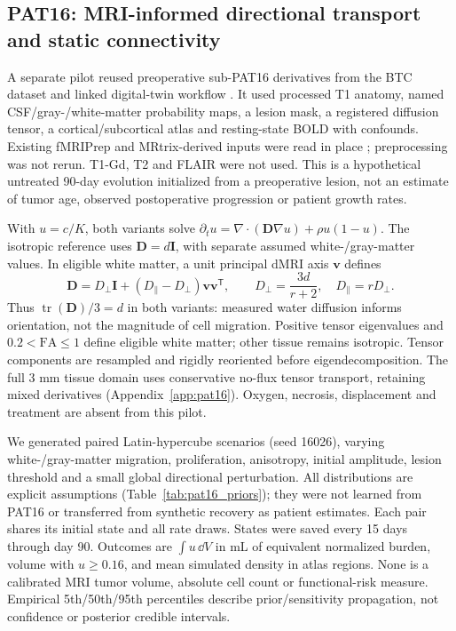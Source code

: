 \subsection{PAT16: MRI-informed directional transport and static connectivity}\label{sec:pat16_methods}
A separate pilot reused preoperative sub-PAT16 derivatives from the BTC dataset and linked digital-twin workflow \citep{aerts2022,lundervold2026twin}. It used processed T1 anatomy, named CSF/gray-/white-matter probability maps, a lesion mask, a registered diffusion tensor, a cortical/subcortical atlas and resting-state BOLD with confounds. Existing fMRIPrep and MRtrix-derived inputs were read in place \citep{esteban2019,tournier2019}; preprocessing was not rerun. T1-Gd, T2 and FLAIR were not used. This is a hypothetical untreated 90-day evolution initialized from a preoperative lesion, not an estimate of tumor age, observed postoperative progression or patient growth rates.

With $u=c/K$, both variants solve $\partial_t u=\nabla\cdot(\mathbf D\nabla u)+\rho u(1-u)$. The isotropic reference uses $\mathbf D=d\mathbf I$, with separate assumed white-/gray-matter values. In eligible white matter, a unit principal dMRI axis $\bm v$ defines
\begin{equation}
 \mathbf D=D_\perp\mathbf I+(D_\parallel-D_\perp)\bm v\bm v^{\mathsf T},\qquad
 D_\perp=\frac{3d}{r+2},\quad D_\parallel=rD_\perp .\label{eq:pat16_tensor}
\end{equation}
Thus $\operatorname{tr}(\mathbf D)/3=d$ in both variants: measured water diffusion informs orientation, not the magnitude of cell migration. Positive tensor eigenvalues and $0.2<\mathrm{FA}\leq1$ define eligible white matter; other tissue remains isotropic. Tensor components are resampled and rigidly reoriented before eigendecomposition. The full 3 mm tissue domain uses conservative no-flux tensor transport, retaining mixed derivatives (Appendix~\ref{app:pat16}). Oxygen, necrosis, displacement and treatment are absent from this pilot.

We generated \PATScenarios{} paired Latin-hypercube scenarios (seed 16026), varying white-/gray-matter migration, proliferation, anisotropy, initial amplitude, lesion threshold and a small global directional perturbation. All distributions are explicit assumptions (Table~\ref{tab:pat16_priors}); they were not learned from PAT16 or transferred from synthetic recovery as patient estimates. Each pair shares its initial state and all rate draws. States were saved every 15 days through day 90. Outcomes are $\int u\,\dd V$ in mL of equivalent normalized burden, volume with $u\geq0.16$, and mean simulated density in atlas regions. None is a calibrated MRI tumor volume, absolute cell count or functional-risk measure. Empirical 5th/50th/95th percentiles describe prior/sensitivity propagation, not confidence or posterior credible intervals.

